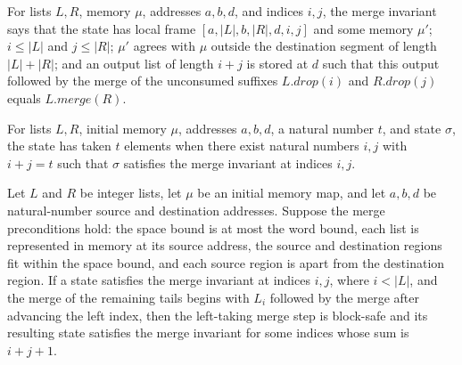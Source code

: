 \begin{definition}
\label{Light.Merge.Inv}
\leanok
{}
For lists $L,R$, memory $\mu$, addresses $a,b,d$, and indices $i,j$, the merge invariant
says that the state has local frame $[a,|L|,b,|R|,d,i,j]$ and some memory $\mu\prime$;
$i\le |L|$ and $j\le |R|$; $\mu\prime$ agrees with $\mu$ outside the destination
segment of length $|L|+|R|$; and an output list of length $i+j$ is stored at $d$ such
that this output followed by the merge of the unconsumed suffixes $L.drop(i)$ and
$R.drop(j)$ equals $L.merge(R)$.
\end{definition}

\begin{definition}
\label{Light.Merge.Taken}
\leanok
{}
For lists $L,R$, initial memory $\mu$, addresses $a,b,d$, a natural number $t$, and state $\sigma$,
the state has taken $t$ elements when there exist natural numbers $i,j$ with $i+j=t$ such
that $\sigma$ satisfies the merge invariant at indices $i,j$.
\end{definition}

\begin{theorem}
\label{Light.Merge.takeLeft}
\leanok
{}
Let $L$ and $R$ be integer lists, let $\mu$ be an initial memory map, and let $a,b,d$ be
natural-number source and destination addresses. Suppose the merge preconditions hold:
the space bound is at most the word bound, each list is represented in memory at its
source address, the source and destination regions fit within the space bound, and each
source region is apart from the destination region. If a state satisfies the merge
invariant at indices $i,j$, where $i<|L|$, and the merge of the remaining tails begins
with $L_i$ followed by the merge after advancing the left index, then the left-taking
merge step is block-safe and its resulting state satisfies the merge invariant for some
indices whose sum is $i+j+1$.
\end{theorem}

